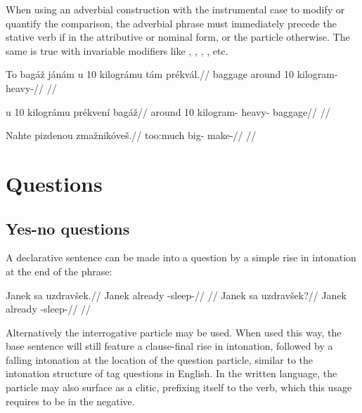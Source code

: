 When using an adverbial construction with the instrumental case to modify or quantify the comparison, the adverbial phrase must immediately precede the stative verb if in the attributive or nominal form, or the particle  otherwise. The same is true with invariable modifiers like , , , , etc.

\ex
\begingl
\gla To bag\'a\v{z} j\'an\'am u 10 kilogr\'amu t\'am pr\'ekv\'al.//
\glb {} baggage  around 10 kilogram-  heavy-//
\glft {}//
\endgl
\xe

\ex
\begingl
\gla u 10 kilogr\'amu pr\'ekven\'i bag\'a\v{z}//
\glb around 10 kilogram- heavy- baggage//
\glft {}//
\endgl
\xe

\ex
\begingl
\gla Nahte pizdenou zma\v{z}nik\'ove\v{s}.//
\glb too:much big- make-//
\glft {}//
\endgl
\xe

\section{Questions}

\subsection{Yes-no questions}

A declarative sentence can be made into a question by a simple rise in intonation at the end of the phrase:

\pex
\a
\begingl
\gla Janek sa uzdrav\v{s}ek.//
\glb Janek already -sleep-//
\glft {}//
\endgl
\a
\begingl
\gla Janek sa uzdrav\v{s}ek?//
\glb Janek already -sleep-//
\glft {}//
\endgl
\xe

Alternatively the interrogative particle  may be used. When used this way, the base sentence will still feature a clause-final rise in intonation, followed by a falling intonation at the location of the question particle, similar to the intonation structure of tag questions in English. In the written language, the particle  may also surface as a clitic, prefixing itself to the verb, which this usage requires to be in the negative.

